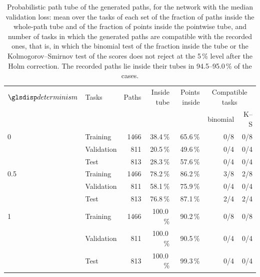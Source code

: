 \documentclass[12pt]{report}
\begin{document}
\begin{table}[htbp]
    \centering
    \caption{Probabilistic path tube of the generated paths, for the network with the median validation loss: mean over the tasks of each set of the fraction of paths inside the whole-path tube and of the fraction of points inside the pointwise tube, and number of tasks in which the generated paths are compatible with the recorded ones, that is, in which the binomial test of the fraction inside the tube or the Kolmogorov--Smirnov test of the scores does not reject at the 5\,\% level after the Holm correction. The recorded paths lie inside their tubes in 94.5--95.0\,\% of the cases.}
    \label{tab:path_tube}
    \begin{tabular}{llrrrrr}
        \toprule
        $\sym{determinism}$ & Tasks & Paths & Inside tube & Points inside & \multicolumn{2}{c}{Compatible tasks}\\
        & & & & & binomial & K--S\\
        \midrule
        0   & Training   & 1466 & 38.4\,\% & 65.6\,\% & 0/8 & 0/8\\
            & Validation &  811 & 20.5\,\% & 49.6\,\% & 0/4 & 0/4\\
            & Test       &  813 & 28.3\,\% & 57.6\,\% & 0/4 & 0/4\\
        \midrule
        0.5 & Training   & 1466 & 78.2\,\% & 86.2\,\% & 3/8 & 2/8\\
            & Validation &  811 & 58.1\,\% & 75.9\,\% & 0/4 & 0/4\\
            & Test       &  813 & 76.8\,\% & 87.1\,\% & 2/4 & 2/4\\
        \midrule
        1   & Training   & 1466 & 100.0\,\% & 90.2\,\% & 0/8 & 0/8\\
            & Validation &  811 & 100.0\,\% & 90.5\,\% & 0/4 & 0/4\\
            & Test       &  813 & 100.0\,\% & 99.3\,\% & 0/4 & 0/4\\
        \bottomrule
    \end{tabular}
\end{table}
\end{document}
